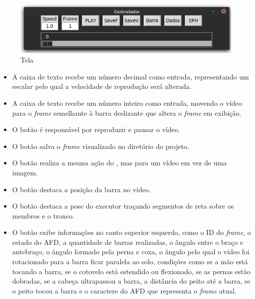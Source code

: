 \begin{figure}[H]
	\centering
	\caption{Tela }
	\includegraphics[scale=0.5]{figuras/view/painel_controller.png}
\end{figure}


\begin{itemize}
	\item A caixa de texto  recebe um número decimal como entrada, representando um escalar pelo qual a velocidade de reprodução será alterada.

	\item A caixa de texto  recebe um número inteiro como entrada, movendo o vídeo para o \textit{frame} semelhante à barra deslizante que altera o \textit{frame} em exibição.
	
	\item O botão  é responsável por reproduzir e pausar o vídeo.
	
	\item O botão  salva o \textit{frame} visualizado no diretório  do projeto.
	
	\item O botão  realiza a mesma ação do , mas para um vídeo em vez de uma imagem.
	
	\item O botão  destaca a posição da barra no vídeo.
	
	\item O botão  destaca a pose do executor traçando segmentos de reta sobre os membros e o tronco.
    
    \item O botão  exibe informações no canto superior esquerdo, como o ID do \textit{frame}, o estado do \ac{AFD}, a quantidade de barras realizadas, o ângulo entre o braço e antebraço, o ângulo formado pela perna e coxa, o ângulo pelo qual o vídeo foi rotacionado para a barra ficar paralela ao solo, condições como se a mão está tocando a barra, se o cotovelo está estendido ou flexionado, se as pernas estão dobradas, se a cabeça ultrapassou a barra, a distância do peito até a barra, se o peito tocou a barra e o caractere do \ac{AFD} que representa o \textit{frame} atual.
	
\end{itemize}



